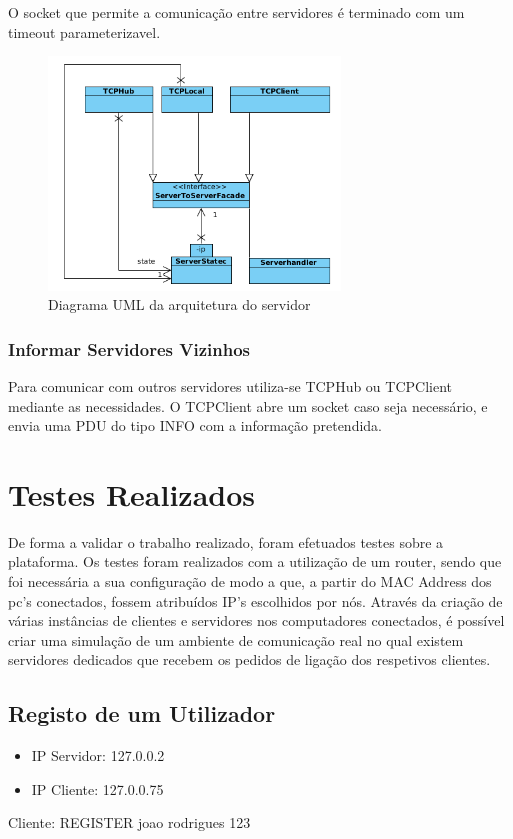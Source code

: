 \documentclass[runningheads,a4paper]{llncs}
\begin{document}
O socket que permite a comunicação entre servidores é terminado com um timeout parameterizavel.

\begin{figure}
\centering
\includegraphics[height=6.2cm]{facades.png}
\caption{Diagrama UML da arquitetura do servidor}
\label{fig:diagram-facades}
\end{figure}


\subsubsection{Informar Servidores Vizinhos}

Para comunicar com outros servidores utiliza-se TCPHub ou TCPClient mediante as necessidades.
O TCPClient abre um socket caso seja necessário, e envia uma PDU do tipo INFO com a informação pretendida.

\section{Testes Realizados}

De forma a validar o trabalho realizado, foram efetuados testes sobre a plataforma. Os testes foram realizados com a utilização de um router, sendo que foi necessária a sua configuração de modo a que, a partir do MAC Address dos pc’s conectados, fossem atribuídos IP’s escolhidos por nós. Através da criação de várias instâncias de clientes e servidores nos computadores conectados, é possível criar uma simulação de um ambiente de comunicação real no qual existem servidores dedicados que recebem os pedidos de ligação dos respetivos clientes.

\subsection{Registo de um Utilizador}

\begin{itemize}

\item IP Servidor: 127.0.0.2
\item IP Cliente: 127.0.0.75

\end{itemize}
Cliente: REGISTER joao rodrigues 123
\end{document}
